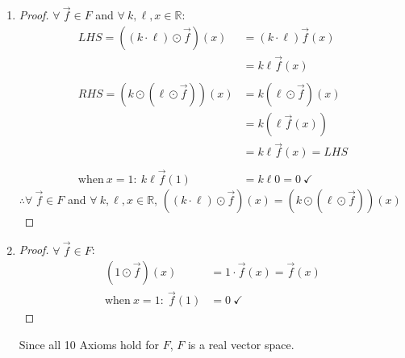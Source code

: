 \documentclass{article}
\newcommand{\bld}{\textbf}
\newcommand{\bb}{\mathbb}
\newcommand{\bitem}[1]{\item[\bld{#1.}]}
\begin{document}
\begin{enumerate}
\begin{proof}
\begin{align*}
                                                           & = k\vec{f}(x) + \ell\vec{f}(x)                   \\ \\
      RHS = (k \odot \vec{f} \oplus \ell \odot \vec{f})(x) & = (k \odot \vec{f})(x) + (\ell \odot \vec{f})(x) \\
                                                           & = k\vec{f}(x) + \ell\vec{f}(x) = LHS             \\ \\
      \text{when}~x=1:~k\vec{f}(1) + \ell\vec{f}(1)        & = k0 + \ell0 = 0~\checkmark
    \end{align*}
    $\therefore \forall~\vec{f} \in F$ and $\forall~k, \ell, x \in \bb{R}$, $((k + \ell) \odot \vec{f})(x) = (k \odot \vec{f} \oplus \ell \odot \vec{f})(x)$
  \end{proof}
  \bitem{Axiom 9}
  \begin{proof}
    $\forall~\vec{f} \in F$ and $\forall~k, \ell, x \in \bb{R}$:
    \begin{align*}
      LHS = ((k \cdot \ell) \odot \vec{f})(x) & = (k \cdot \ell)\vec{f}(x) \\
                                              & = k\ell\vec{f}(x)          \\ \\
      RHS = (k \odot (\ell \odot \vec{f}))(x) & = k(\ell \odot \vec{f})(x) \\
                                              & = k(\ell\vec{f}(x))        \\
                                              & = k\ell\vec{f}(x) = LHS    \\ \\
      \text{when}~x=1:~k\ell\vec{f}(1)        & = k\ell0 = 0~\checkmark
    \end{align*}
    $\therefore \forall~\vec{f} \in F$ and $\forall~k, \ell, x \in \bb{R}$, $((k \cdot \ell) \odot \vec{f})(x) = (k \odot (\ell \odot \vec{f}))(x)$
  \end{proof}
  \bitem{Axiom 10}
  \begin{proof}
    $\forall~\vec{f} \in F$:
    \begin{align*}
      (1 \odot \vec{f})(x)        & = 1\cdot\vec{f}(x) = \vec{f}(x) \\
      \text{when}~x=1:~\vec{f}(1) & = 0~\checkmark
    \end{align*}
  \end{proof}
  Since all 10 Axioms hold for $F$, $F$ is a real vector space.
\end{enumerate}
\end{document}
